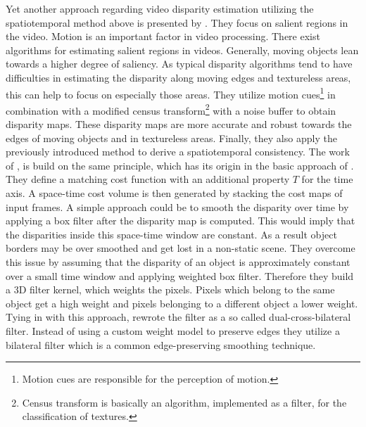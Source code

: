 \noindent Yet another approach regarding video disparity estimation utilizing the spatiotemporal method above is presented by \citeauthor{lee2012local} \citep{lee2012local}.
They focus on salient regions in the video.
Motion is an important factor in video processing.
There exist algorithms for estimating salient regions in videos.
Generally, moving objects lean towards a higher degree of saliency.
As typical disparity algorithms tend to have difficulties in estimating the disparity along moving edges and textureless areas, this can help to focus on especially those areas.
They utilize motion cues\footnote{Motion cues are responsible for the perception of motion.} in combination with a modified census transform\footnote{Census transform is basically an algorithm, implemented as a filter, for the classification of textures.} with a noise buffer to obtain disparity maps.
These disparity maps are more accurate and robust towards the edges of moving objects and in textureless areas.
Finally, they also apply the previously introduced method to derive a spatiotemporal consistency.
\newline\newline\noindent The work of \citeauthor{richardt2010real} \citep{richardt2010real}, \citeauthor{hosni2012temporally} \citep{hosni2012temporally} is build on the same principle, which has its origin in the basic approach of \citeauthor{davis2003spacetime} \citep{davis2003spacetime}.
They define a matching cost function with an additional property $T$ for the time axis.
A space-time cost volume is then generated by stacking the cost maps of input frames.
A simple approach could be to smooth the disparity over time by applying a box filter after the disparity map is computed.
This would imply that the disparities inside this space-time window are constant.
As a result object borders may be over smoothed and get lost in a non-static scene.
They overcome this issue by assuming that the disparity of an object is approximately constant over a small time window and applying weighted box filter.
Therefore they build a 3D filter kernel, which weights the pixels.
Pixels which belong to the same object get a high weight and pixels belonging to a different object a lower weight.
\newline\newline\noindent Tying in with this approach, \citeauthor{richardt2010real} \citep{richardt2010real} rewrote the filter as a so called dual-cross-bilateral filter.
Instead of using a custom weight model to preserve edges they utilize a bilateral filter which is a common edge-preserving smoothing technique.
